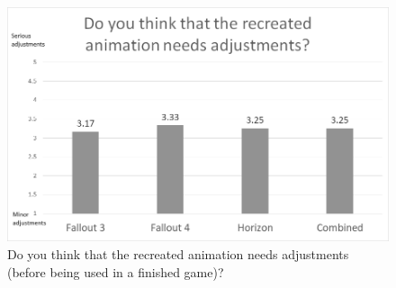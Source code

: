\begin{figure}[!ht]
	\centerline{\includegraphics[width = 42em]{img/results/adjustments.png}}
	\caption{Do you think that the recreated animation needs adjustments (before being used in a finished game)?}\label{fig:adjustments_graph}
\end{figure}











